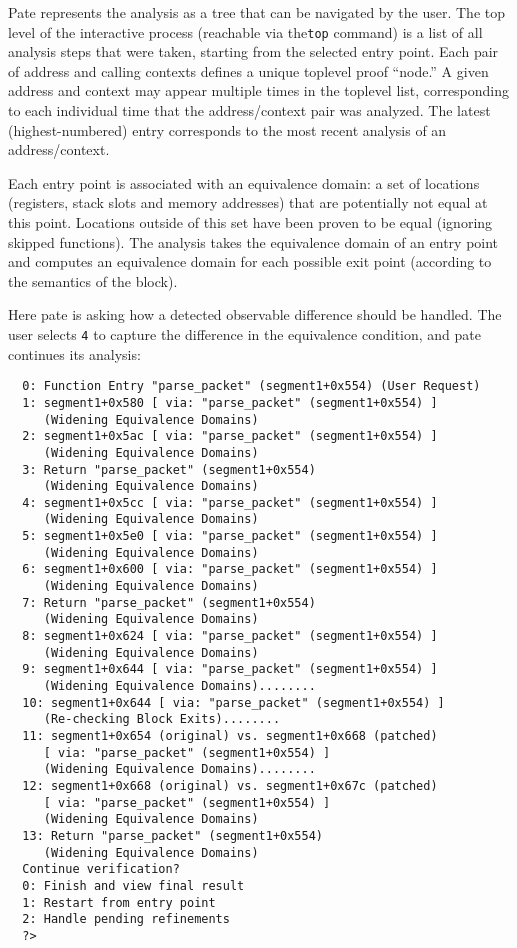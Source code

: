 Pate represents the analysis as a tree that can be navigated by the user.
The top level of the interactive process (reachable via the\texttt{top} command) is a list of all analysis steps that were taken, starting from the selected entry point.
Each pair of address and calling contexts defines a unique toplevel proof ``node.''
A given address and context may appear multiple times in the toplevel list, corresponding to each individual time that the address/context pair was analyzed.
The latest (highest-numbered) entry corresponds to the most recent analysis of an address/context.

Each entry point is associated with an equivalence domain: a set of locations (registers, stack slots and memory addresses) that are potentially not equal at this point.
Locations outside of this set have been proven to be equal (ignoring skipped functions).
The analysis takes the equivalence domain of an entry point and computes an equivalence domain for each possible exit point (according to the semantics of the block).

Here pate is asking how a detected observable difference should be handled.
The user selects \texttt{4} to capture the difference in the equivalence condition, and pate continues its analysis:

\begin{verbatim}
  0: Function Entry "parse_packet" (segment1+0x554) (User Request)
  1: segment1+0x580 [ via: "parse_packet" (segment1+0x554) ]
     (Widening Equivalence Domains)
  2: segment1+0x5ac [ via: "parse_packet" (segment1+0x554) ]
     (Widening Equivalence Domains)
  3: Return "parse_packet" (segment1+0x554)
     (Widening Equivalence Domains)
  4: segment1+0x5cc [ via: "parse_packet" (segment1+0x554) ]
     (Widening Equivalence Domains)
  5: segment1+0x5e0 [ via: "parse_packet" (segment1+0x554) ]
     (Widening Equivalence Domains)
  6: segment1+0x600 [ via: "parse_packet" (segment1+0x554) ]
     (Widening Equivalence Domains)
  7: Return "parse_packet" (segment1+0x554)
     (Widening Equivalence Domains)
  8: segment1+0x624 [ via: "parse_packet" (segment1+0x554) ]
     (Widening Equivalence Domains)
  9: segment1+0x644 [ via: "parse_packet" (segment1+0x554) ]
     (Widening Equivalence Domains)........
  10: segment1+0x644 [ via: "parse_packet" (segment1+0x554) ]
     (Re-checking Block Exits)........
  11: segment1+0x654 (original) vs. segment1+0x668 (patched)
     [ via: "parse_packet" (segment1+0x554) ]
     (Widening Equivalence Domains)........
  12: segment1+0x668 (original) vs. segment1+0x67c (patched)
     [ via: "parse_packet" (segment1+0x554) ]
     (Widening Equivalence Domains)
  13: Return "parse_packet" (segment1+0x554)
     (Widening Equivalence Domains)
  Continue verification?
  0: Finish and view final result
  1: Restart from entry point
  2: Handle pending refinements
  ?>
\end{verbatim}

